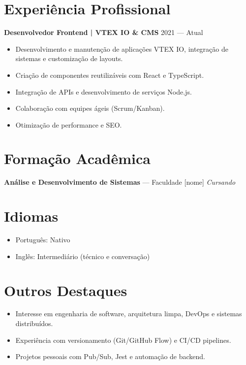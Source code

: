\documentclass[a4paper,10pt]{article}
\begin{document}
\section*{Experiência Profissional}
\textbf{Desenvolvedor Frontend | VTEX IO \& CMS} \hfill 2021 — Atual\\[-4pt]
\begin{itemize}[leftmargin=1.2em, noitemsep, topsep=3pt]
    \item Desenvolvimento e manutenção de aplicações VTEX IO, integração de sistemas e customização de layouts.
    \item Criação de componentes reutilizáveis com React e TypeScript.
    \item Integração de APIs e desenvolvimento de serviços Node.js.
    \item Colaboração com equipes ágeis (Scrum/Kanban).
    \item Otimização de performance e SEO.
\end{itemize}

\section*{Formação Acadêmica}
\textbf{Análise e Desenvolvimento de Sistemas} — Faculdade [nome] \hfill \textit{Cursando}

\section*{Idiomas}
\begin{itemize}[leftmargin=1.2em, noitemsep, topsep=3pt]
    \item Português: Nativo
    \item Inglês: Intermediário (técnico e conversação)
\end{itemize}

\section*{Outros Destaques}
\begin{itemize}[leftmargin=1.2em, noitemsep, topsep=3pt]
    \item Interesse em engenharia de software, arquitetura limpa, DevOps e sistemas distribuídos.
    \item Experiência com versionamento (Git/GitHub Flow) e CI/CD pipelines.
    \item Projetos pessoais com Pub/Sub, Jest e automação de backend.
\end{itemize}
\end{document}
